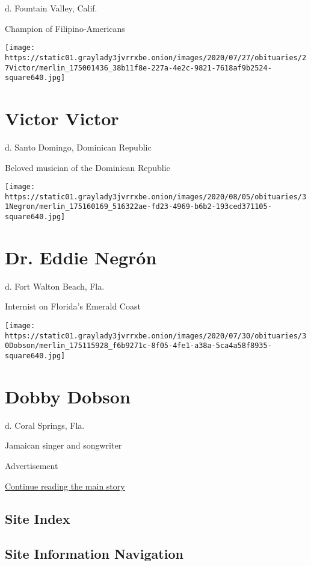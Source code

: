d. Fountain Valley, Calif.

Champion of Filipino-Americans

\texttt{[image: https://static01.graylady3jvrrxbe.onion/images/2020/07/27/obituaries/27Victor/merlin\_175001436\_38b11f8e-227a-4e2c-9821-7618af9b2524-square640.jpg]}

\hypertarget{victor-victor}{%
\section{Victor Victor}\label{victor-victor}}

d. Santo Domingo, Dominican Republic

Beloved musician of the Dominican Republic

\texttt{[image: https://static01.graylady3jvrrxbe.onion/images/2020/08/05/obituaries/31Negron/merlin\_175160169\_516322ae-fd23-4969-b6b2-193ced371105-square640.jpg]}

\hypertarget{dr-eddie-negruxf3n}{%
\section{Dr. Eddie Negrón}\label{dr-eddie-negruxf3n}}

d. Fort Walton Beach, Fla.

Internist on Florida's Emerald Coast

\texttt{[image: https://static01.graylady3jvrrxbe.onion/images/2020/07/30/obituaries/30Dobson/merlin\_175115928\_f6b9271c-8f05-4fe1-a38a-5ca4a58f8935-square640.jpg]}

\hypertarget{dobby-dobson}{%
\section{Dobby Dobson}\label{dobby-dobson}}

d. Coral Springs, Fla.

Jamaican singer and songwriter

Advertisement

\protect\hyperlink{after-bottom}{Continue reading the main story}

\hypertarget{site-index}{%
\subsection{Site Index}\label{site-index}}

\hypertarget{site-information-navigation}{%
\subsection{Site Information
Navigation}\label{site-information-navigation}}

